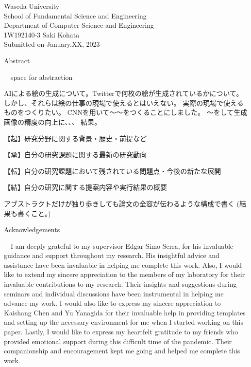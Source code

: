 \documentclass[a4paper, oneside, 12pt, dvipdfmx]{book}
\begin{document}
\begin{titlepage}
\begin{center}
    \vspace{0.05\textheight}
    {\Large 
        Waseda University \\
        School of Fundamental Science and Engineering \\
        Department of Computer Science and Engineering \\}
    \vspace{0.05\textheight}
    {\Large 1W192140-3 Saki Kohata \\}
    \vspace{0.05\textheight}
    {Submitted on January.XX, 2023}
\end{center}
\end{titlepage}
    

\pagebreak
\hspace{0pt}
\vfill %
    \begin{center}
    Abstract
    \end{center}
　space for abstraction

AIによる絵の生成について。Twitterで何枚の絵が生成されているかについて。
しかし、それらは絵の仕事の現場で使えるとはいえない。
実際の現場で使えるものをつくりたい。
CNNを用いて～～をつくることにしました。
～をして生成画像の精度の向上に、、、
結果。

【起】研究分野に関する背景・歴史・前提など

【承】自分の研究課題に関する最新の研究動向

【転】自分の研究課題において残されている問題点・今後の新たな展開

【結】自分の研究に関する提案内容や実行結果の概要

アブストラクトだけが独り歩きしても論文の全容が伝わるような構成で書く
(結果も書くこと。)

\vfill
\pagebreak

\pagebreak
\hspace{0pt}
\vfill 
    \begin{center}
    Acknowledgements
    \end{center}
    　I am deeply grateful to my supervisor Edgar Simo-Serra, for his invaluable 
    guidance and support throughout my research. His insightful advice and assistance 
    have been invaluable in helping me complete this work.
    Also, I would like to extend my sincere appreciation to the members of my laboratory
    for their invaluable contributions to my research. Their insights and suggestions 
    during seminars and individual discussions have been instrumental in helping me 
    advance my work.
    I would also like to express my sincere appreciation to Kaishang Chen and  Yu Yanagida 
    for their invaluable help in providing templates and setting up the necessary 
    environment for me when I started working on this paper. 
    Lastly, I would like to express my heartfelt gratitude to my friends who provided 
    emotional support during this difficult time of the pandemic. Their companionship 
    and encouragement kept me going and helped me complete this work. 
\end{document}
